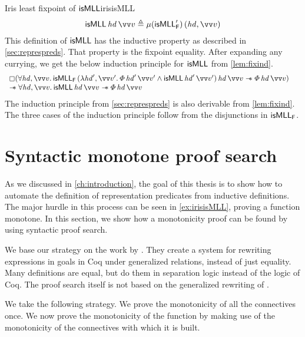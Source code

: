 \documentclass[thesis.tex]{subfiles}
\begin{document}
\begin{example}{Iris least fixpoint of $\textsf{\upshape isMLL}$}{irisisMLL}
  \begin{align*}
    \isMLL\, \hd\, \vect{\val} \eqdef \lfp(\isMLL'_\hopred)\, (\hd, \vect{\val})
  \end{align*}
  This definition of $\textsf{\upshape isMLL}$ has the inductive property as described in \cref{sec:represpreds}. That property is the fixpoint equality. After expanding any currying, we get the below induction principle for $\textsf{\upshape isMLL}$ from \cref{lem:fixind}.
  \begin{align*}
     & \begin{array}{l}
         \always(\All\hd,\vect{\val}.\isMLL_\hopred\,(\Lam\hd',\vect{\val}'. \pred\,\hd'\,\vect{\val}' \land \isMLL\,\hd'\,\vect{\val}')\,\hd\,\vect{\val} \wand \pred\,\hd\,\vect{\val}) \\
         \wand \All\hd,\vect{\val}. \isMLL\,\hd\,\vect{\val} \wand \pred\,\hd\,\vect{\val}
       \end{array}
  \end{align*}
  The induction principle from \cref{sec:represpreds} is also derivable from \cref{lem:fixind}. The three cases of the induction principle follow from the disjunctions in $\textsf{\upshape isMLL}_{\textsf{\upshape F}}$.

\end{example}

\section{Syntactic monotone proof search}
\label{sec:monoproofsearch}%
As we discussed in \cref{ch:introduction}, the goal of this thesis is to show how to automate the definition of representation predicates from inductive definitions. The major hurdle in this process can be seen in \cref{ex:irisisMLL}, proving a function monotone. In this section, we show how a monotonicity proof can be found by using syntactic proof search.

We base our strategy on the work by  \cite{sozeauNewLookGeneralized2009}. They create a system for rewriting expressions in goals in Coq under generalized relations, instead of just equality. Many definitions are equal, but do them in separation logic instead of the logic of Coq. The proof search itself is not based on the generalized rewriting of .

We take the following strategy. We prove the monotonicity of all the connectives once. We now prove the monotonicity of the function by making use of the monotonicity of the connectives with which it is built.
\end{document}
